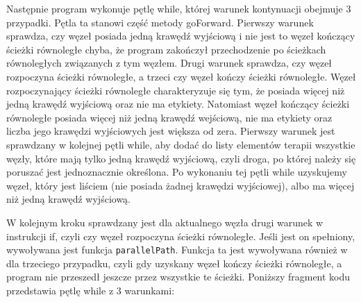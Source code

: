Następnie program wykonuje pętlę while, której warunek kontynuacji obejmuje 3 przypadki. Pętla ta stanowi część metody goForward.
Pierwszy warunek sprawdza, czy węzeł posiada jedną krawędź wyjściową i nie jest to węzeł kończący ścieżki równoległe chyba, że program zakończył przechodzenie po ścieżkach równoległych związanych z tym węzłem. 
Drugi warunek sprawdza, czy węzeł rozpoczyna ścieżki równoległe, a trzeci czy węzeł kończy ścieżki równoległe. Węzeł rozpoczynający ścieżki równoległe charakteryzuje się tym, że posiada więcej niż jedną krawędź wyjściową oraz nie ma etykiety. Natomiast węzeł kończący ścieżki równoległe posiada więcej niż jedną krawędź wejściową, nie ma etykiety oraz liczba jego krawędzi wyjściowych jest większa od zera. 
Pierwszy warunek jest sprawdzany w kolejnej pętli while, aby dodać do listy elementów terapii wszystkie węzły, które mają tylko jedną krawędź wyjściową, czyli droga, po której należy się poruszać jest jednoznacznie określona. 
Po wykonaniu tej pętli while uzyskujemy węzeł, który jest liściem (nie posiada żadnej krawędzi wyjściowej), 
albo ma więcej niż jedną krawędź wyjściową.

W kolejnym kroku sprawdzany jest dla aktualnego węzła drugi warunek w instrukcji if, czyli czy węzeł rozpoczyna ścieżki równoległe. Jeśli jest on spełniony, wywoływana jest funkcja \texttt{parallel\-Path}. 
Funkcja ta jest wywoływana również w dla trzeciego przypadku, czyli gdy uzyskany węzeł kończy ścieżki równoległe, a program nie przeszedł jeszcze przez wszystkie te ścieżki. 
Poniższy fragment kodu przedstawia pętlę while z 3 warunkami:

